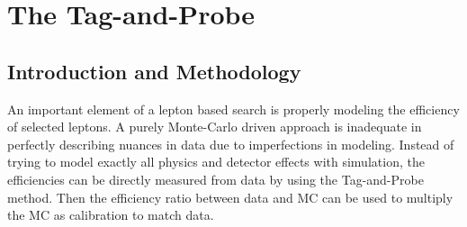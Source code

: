 \chapter{The Tag-and-Probe}


\section{Introduction and Methodology}
An important element of a lepton based search is properly modeling the efficiency of selected leptons. A purely Monte-Carlo driven approach is inadequate in perfectly describing nuances in data due to imperfections in modeling. Instead of trying to model exactly all physics and detector effects with simulation, the efficiencies can be directly measured from data by using the Tag-and-Probe method. Then the efficiency ratio between data and MC can be used to multiply the MC as calibration to match data. 

